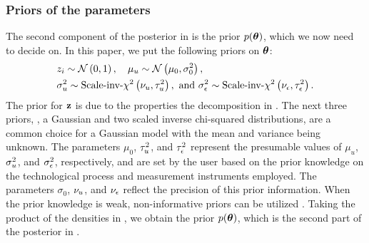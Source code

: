 \subsubsection{Priors of the parameters}
The second component of the posterior in  is the prior $\f{\vparam}$, which we now need to decide on. In this paper, we put the following priors on ${\boldsymbol\theta}$:
\begin{align}
  & \z_i \sim \gaussian{0}{1}, \hspace{1em} \mu_\u \sim \gaussian{\mu_0}{\sigma^2_0},  \elabel{priors} \\
  & \sigma^2_\u \sim \sichisquared{\nu_\u}{\tau^2_\u}, \text{ and } \sigma^2_\noise \sim \sichisquared{\nu_\noise}{\tau^2_\noise}. \nonumber
\end{align}
The prior for $\mathbf{z}$ is due to the properties the decomposition in .
The next three priors, \ie, a Gaussian and two scaled inverse chi-squared distributions, are a common choice for a Gaussian model with the mean and variance being unknown.
The parameters $\mu_0$, $\tau^2_u$, and $\tau^2_\epsilon$ represent the presumable values of $\mu_u$, $\sigma^2_u$, and $\sigma^2_\epsilon$, respectively, and are set by the user based on the prior knowledge on the technological process and measurement instruments employed. The parameters $\sigma_0$, $\nu_u$, and $\nu_\epsilon$ reflect the precision of this prior information.
When the prior knowledge is weak, non-informative priors can be utilized \cite{gelman2004, bernardo2007}.
Taking the product of the densities in , we obtain the prior $\f{\vparam}$, which is the second part of the posterior in .

